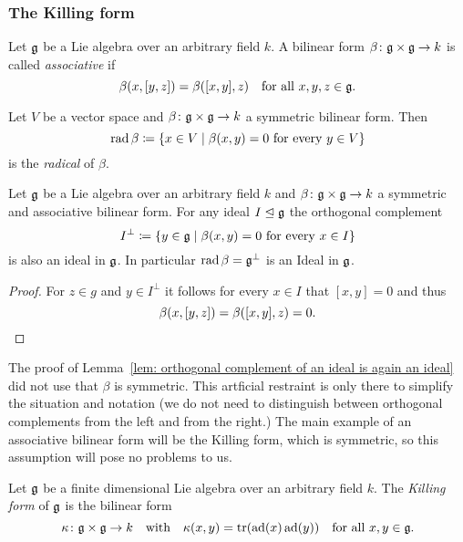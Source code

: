 \subsubsection{The Killing form}




\begin{defi}
 Let $\mathfrak{g}$ be a Lie algebra over an arbitrary field $k$. A bilinear form $\beta \colon \mathfrak{g} \times \mathfrak{g} \to k$ is called \emph{associative} if
 \[
  \beta(x,[y,z]) = \beta([x,y],z) \quad \text{for all $x,y,z \in \mathfrak{g}$}.
 \]
\end{defi}


\begin{defi}
 Let $V$ be a vector space and $\beta \colon \mathfrak{g} \times \mathfrak{g} \to k$ a symmetric bilinear form. Then
 \[
  \operatorname{rad} \beta \coloneqq \{x \in V \mid \text{$\beta(x,y) = 0$ for every $y \in V$}\}
 \]
 is the \emph{radical} of $\beta$.
\end{defi}


\begin{lem}\label{lem: orthogonal complement of an ideal is again an ideal}
 Let $\mathfrak{g}$ be a Lie algebra over an arbitrary field $k$ and \mbox{$\beta \colon \mathfrak{g} \times \mathfrak{g} \to k$} a symmetric and associative bilinear form. For any ideal $I \trianglelefteq \mathfrak{g}$ the orthogonal complement
 \[
  I^\perp \coloneqq \{y \in \mathfrak{g} \mid \text{$\beta(x,y) = 0$ for every $x \in I$}\}
 \]
 is also an ideal in $\mathfrak{g}$. In particular $\operatorname{rad} \beta = \mathfrak{g}^\perp$ is an Ideal in $\mathfrak{g}$.
\end{lem}
\begin{proof}
 For $z \in g$ and $y \in I^\perp$ it follows for every $x \in I$ that $[x,y] = 0$ and thus
 \[
  \beta(x,[y,z]) = \beta([x,y],z) = 0.
  \qedhere
 \]
\end{proof}


\begin{rem}
 The proof of Lemma~\ref{lem: orthogonal complement of an ideal is again an ideal} did not use that $\beta$ is symmetric. This artficial restraint is only there to simplify the situation and notation (we do not need to distinguish between orthogonal complements from the left and from the right.) The main example of an associative bilinear form will be the Killing form, which is symmetric, so this assumption will pose no problems to us.
\end{rem}




\begin{defi}
 Let $\mathfrak{g}$ be a finite dimensional Lie algebra over an arbitrary field $k$. The \emph{Killing form} of $\mathfrak{g}$ is the bilinear form
 \[
  \kappa \colon \mathfrak{g} \times \mathfrak{g} \to k
  \quad\text{with}\quad
  \kappa(x,y) = \operatorname{tr}(\operatorname{ad}(x) \operatorname{ad}(y))
  \quad\text{for all $x,y \in \mathfrak{g}$}.
 \]
\end{defi}


